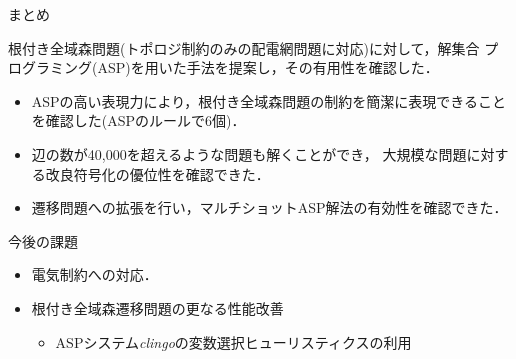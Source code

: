 \documentclass[dvipdfmx,11pt]{beamer}
\begin{document}
\begin{frame}{まとめ}
\begin{alertblock}{}
  根付き全域森問題(トポロジ制約のみの配電網問題に対応)に対して，解集合
  プログラミング(ASP)を用いた手法を提案し，その有用性を確認した．
\end{alertblock}
\begin{itemize}
\item {}
  ASPの高い表現力により，根付き全域森問題の制約を簡潔に表現できること
  を確認した(ASPのルールで6個)．
\item {}
  辺の数が40,000を超えるような問題も解くことができ，
  大規模な問題に対する改良符号化の優位性を確認できた．
\item {}
  遷移問題への拡張を行い，マルチショットASP解法の有効性を確認できた．
\end{itemize}
\vfill
\begin{block}{今後の課題}
  \begin{itemize}
  \item 電気制約への対応．
  \item 根付き全域森遷移問題の更なる性能改善
    \begin{itemize}
    \item ASPシステム\textit{clingo}の変数選択ヒューリスティクスの利用
    \end{itemize}
  \end{itemize}
 \end{block}
\end{frame}





\end{document}
